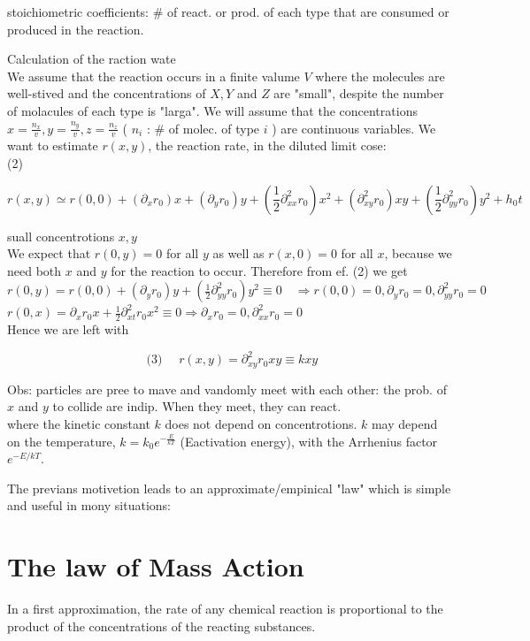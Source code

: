 \documentclass[10pt]{article}
\begin{document}
stoichiometric coefficients: \# of react. or prod. of each type that are consumed or produced in the reaction.

Calculation of the raction wate\\
We assume that the reaction occurs in a finite valume $V$ where the molecules are well-stived and the concentrations of $X, Y$ and $Z$ are "small", despite the number of molacules of each type is "larga". We will assume that the concentrations $x=\frac{n_{x}}{v}, y=\frac{n_{y}}{v}, z=\frac{n_{z}}{v}$ ( $n_{i}$ : \# of molec. of type $i$ ) are continuous variables. We want to estimate $r(x, y)$, the reaction rate, in the diluted limit cose:\\
(2)

$$
r(x, y) \simeq r(0,0)+\left(\partial_{x} r_{0}\right) x+\left(\partial_{y} r_{0}\right) y+\left(\frac{1}{2} \partial_{x x}^{2} r_{0}\right) x^{2}+\left(\partial_{x y}^{2} r_{0}\right) x y+\left(\frac{1}{2} \partial_{y y}^{2} r_{0}\right) y^{2}+h_{0} t
$$

suall concentrotions $x, y$\\
We expect that $r(0, y)=0$ for all $y$ as well as $r(x, 0)=0$ for all $x$, because we need both $x$ and $y$ for the reaction to occur. Therefore from ef. (2) we get\\
$r(0, y)=r(0,0)+\left(\partial_{y} r_{0}\right) y+\left(\frac{1}{2} \partial_{y y}^{2} r_{0}\right) y^{2} \equiv 0 \quad \Rightarrow r(0,0)=0, \partial_{y} r_{0}=0, \partial_{y y}^{2} r_{0}=0$\\
$r(0, x)=\partial_{x} r_{0} x+\frac{1}{2} \partial_{x t}^{2} r_{0} x^{2} \equiv 0 \Rightarrow \partial_{x} r_{0}=0, \partial_{x x}^{2} r_{0}=0$\\
Hence we are left with

$$
\text { (3) } \quad r(x, y)=\partial_{x y}^{2} r_{0} x y \equiv k x y
$$

Obs: particles are pree to mave and vandomly meet with each other: the prob. of $x$ and $y$ to collide are indip. When they meet, they can react.\\
where the kinetic constant $k$ does not depend on concentrotions. $k$ may depend on the temperature, $k=k_{0} e^{-\frac{E}{k T}}$ (Eactivation energy), with the Arrhenius factor $e^{-E / k T}$.

The previans motivetion leads to an approximate/empinical "law" which is simple and useful in mony situations:

\section*{The law of Mass Action}
In a first approximation, the rate of any chemical reaction is proportional to the product of the concentrations of the reacting substances.
\end{document}
